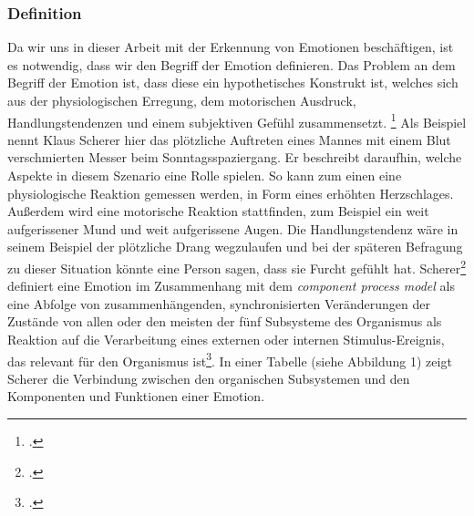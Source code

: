 \subsubsection{Definition}
Da wir uns in dieser Arbeit mit der Erkennung von Emotionen beschäftigen, ist es notwendig, dass wir den Begriff der Emotion definieren. Das Problem an dem Begriff der Emotion ist, dass diese ein hypothetisches Konstrukt ist, welches sich aus der physiologischen Erregung, dem motorischen Ausdruck, Handlungstendenzen und einem subjektiven Gefühl zusammensetzt. \footcite[Vgl.][S.166 Abschnitt Emotion]{Kla02}\newline
Als Beispiel nennt Klaus Scherer hier das plötzliche Auftreten eines Mannes mit einem Blut verschmierten Messer beim Sonntagsspaziergang. Er beschreibt daraufhin, welche Aspekte in diesem Szenario eine Rolle spielen. So kann zum einen eine physiologische Reaktion gemessen werden, in Form eines erhöhten Herzschlages. Außerdem wird eine motorische Reaktion stattfinden, zum Beispiel ein weit aufgerissener Mund und weit aufgerissene Augen. Die Handlungstendenz wäre in seinem Beispiel der plötzliche Drang wegzulaufen und bei der späteren Befragung zu dieser Situation könnte eine Person sagen, dass sie Furcht gefühlt hat.\newline
Scherer\footcite{Kla05} definiert eine Emotion im Zusammenhang mit dem \textit{component process model} als eine Abfolge von zusammenhängenden, synchronisierten Veränderungen der Zustände von allen oder den meisten der fünf Subsysteme des Organismus als Reaktion auf die Verarbeitung eines externen oder internen Stimulus-Ereignis, das relevant für den Organismus ist\footcite[Vgl. ][S.697 Z.32ff Übersetzung ins Deutsche]{Kla05}. In einer Tabelle (siehe Abbildung 1) zeigt Scherer die Verbindung zwischen den organischen Subsystemen und den Komponenten und Funktionen einer Emotion. 
